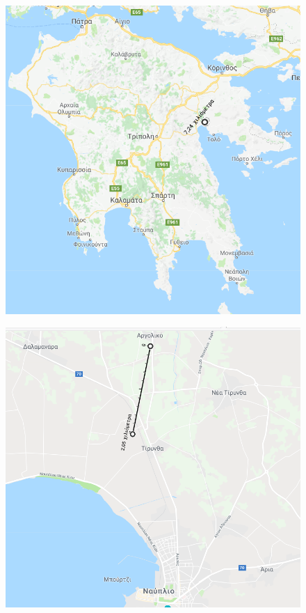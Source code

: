\documentclass[12pt]{article}
\begin{document}
 	\begin{figure} [H]
 		\begin{center}
 			\includegraphics [scale = 0.40] {map41.png}
 		\end{center}
 	\end{figure}
 
 	\begin{figure} [H]
 		\begin{center}
 			\includegraphics [scale = 0.40] {map42.png}
 		\end{center}
 	\end{figure}
 
\end{document}
